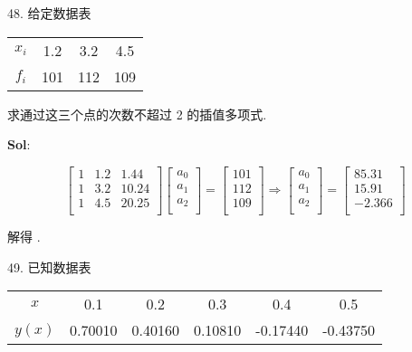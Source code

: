 
48. 给定数据表

\begin{center}
    \begin{tabular}{c|ccc}
        \hline
        $x_i$ & 1.2 & 3.2 & 4.5\\
        $f_i$ & 101 & 112 & 109\\
        \hline
    \end{tabular}
\end{center}

求通过这三个点的次数不超过 2 的插值多项式.

\textbf{Sol}:  

$$
\begin{bmatrix}
    1&1.2&1.44\\
    1&3.2&10.24\\
    1&4.5&20.25\\
\end{bmatrix}\begin{bmatrix}
    a_0\\a_1\\a_2\\
\end{bmatrix}=\begin{bmatrix}
    101\\112\\109\\
\end{bmatrix}\Rightarrow\begin{bmatrix}
    a_0\\a_1\\a_2\\
\end{bmatrix}=\begin{bmatrix}
    85.31\\15.91\\-2.366\\
\end{bmatrix}
$$

解得 .

\vspace{12pt}


49. 已知数据表

\begin{center}
    \begin{tabular}{c|ccccc}
        \hline
        $x$ & 0.1 & 0.2 & 0.3 & 0.4 & 0.5\\
        $y(x)$ & 0.70010 & 0.40160 & 0.10810 &-0.17440 & -0.43750\\
        \hline
    \end{tabular}
\end{center}

